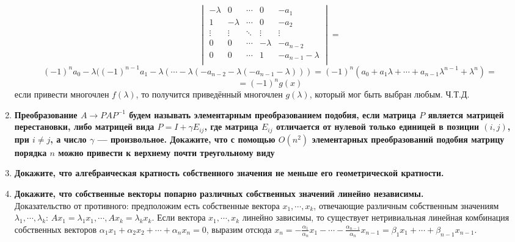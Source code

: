 \documentclass[12pt]{article} %
\begin{document}
\begin{enumerate}
\[\begin{vmatrix}
         -\lambda & 0 & \cdots & 0 &-a_1\\
        1 &  -\lambda & \cdots & 0 & -a_2\\
        \vdots & \vdots & \ddots & \vdots & \vdots\\
         0 & 0 & \cdots &  -\lambda & -a_{n - 2}\\
         0 & 0 &\cdots & 1 & -a_{n - 1}  -\lambda\\
    \end{vmatrix} = \]\[
    (-1)^na_0 - \lambda((-1)^{n - 1}a_1 - \lambda(\cdots -\lambda(-a_{n - 2} - \lambda(-a_{n -1} - \lambda))) = (-1)^n(a_0 + a_1\lambda + \cdots + a_{n - 1}\lambda^{n - 1} + \lambda^n) = \]\[=(-1)^ng(x)
    \]
    если привести многочлен $f(\lambda)$, то получится приведённый многочлен $g(\lambda)$, который мог быть выбран любым. Ч.Т.Д.\\
    
    \item \textbf{Преобразование $A \rightarrow PAP^{-1}$ будем называть элементарным преобразованием подобия, если матрица $P$ является матрицей перестановки, либо матрицей вида $P = I + \gamma E_{ij}$, где матрица $E_{ij} $ отличается от нулевой только единицей в позиции $(i, j)$, при $i \neq j$, а число $\gamma$ --- произвольное. Докажите, что с помощью $O(n^2)$ элементарных преобразований подобия матрицу порядка $n$ можно привести к верхнему почти треугольному виду}%
    \item \textbf{Докажите, что алгебраическая кратность собственного значения не меньше его геометрической кратности.}
    \item \textbf{Докажите, что собственные векторы попарно различных собственных значений линейно независимы.}\\

    Доказательство от противного: предположим есть собственные вектора $x_1, \cdots,  x_k$, отвечающие различным собственным значениям $\lambda_1, \cdots, \lambda_k$: $Ax_1 = \lambda_1x_1, \cdots, Ax_k = \lambda_kx_k$. Если вектора $x_1, \cdots, x_k$ линейно зависимы, то существует нетривиальная линейная комбинация собственных векторов $\alpha_1 x_1 + \alpha_2 x_2 + \cdots + \alpha_n x_n = 0$, выразим отсюда $x_n = -\frac{\alpha_1}{\alpha_n}x_1 - \cdots - \frac{\alpha_{n - 1}}{\alpha_n}x_{n - 1} = \beta_1 x_1 + \cdots + \beta_{n - 1} x_{n - 1}$.\\


\end{enumerate}
\end{document}
